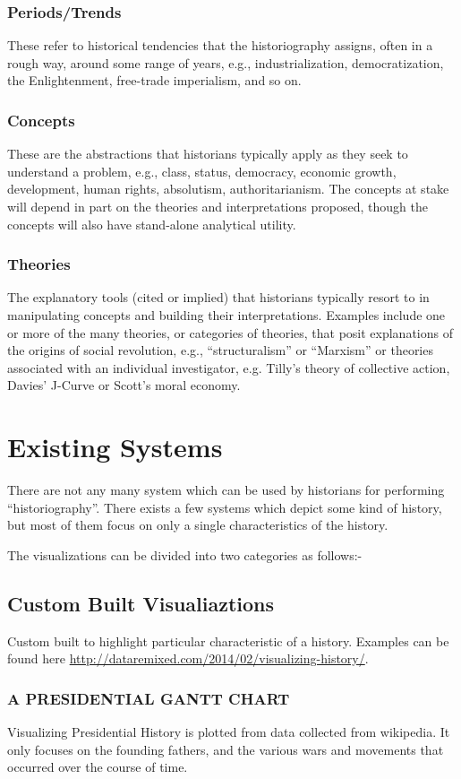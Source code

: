 \subsection{Periods/Trends}
These refer to historical tendencies that the historiography assigns, often in a rough way, around some range of years, e.g., industrialization, democratization, the Enlightenment, free-trade imperialism, and so on.
\subsection{Concepts}
These are the abstractions that historians typically apply as they seek to understand a problem, e.g., class, status, democracy, economic growth, development, human rights, absolutism, authoritarianism.  The concepts at stake will depend in part on the theories and interpretations proposed, though the concepts will also have stand-alone analytical utility.
\subsection{Theories}
The explanatory tools (cited or implied) that historians typically resort to in manipulating concepts and building their interpretations.  Examples include one or more of the many theories, or categories of theories, that posit explanations of the origins of social revolution, e.g., ``structuralism'' or  ``Marxism'' or theories associated with an individual investigator, e.g. Tilly's theory of collective action, Davies' J-Curve or Scott’s moral economy.

\chapter{Existing Systems}
There are not any many system which can be used by historians for performing “historiography”. There exists a few systems which depict some kind of history, but most of them focus on only a single characteristics of the history.

The visualizations can be divided into two categories as follows:-
\section{Custom Built Visualiaztions}
Custom built to highlight particular characteristic of a history. Examples can be found here \url{http://dataremixed.com/2014/02/visualizing-history/}.
\subsection{A PRESIDENTIAL GANTT CHART}
Visualizing Presidential History is plotted from data collected from wikipedia. It only focuses on the founding fathers, and the various wars and movements that occurred over the course of time.
